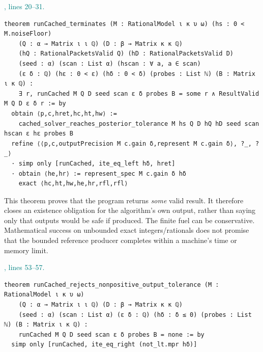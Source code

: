 \documentclass[11pt]{article}\usepackage{needspace}\renewcommand{\paperkind}{Lean companion}\setlength{\parskip}{0.35em}
\begin{document}


{\small\textcolor{teal}{, lines 20--31.}\par}

\begin{lstlisting}[style=BayesSource]
theorem runCached_terminates (M : RationalModel ι κ υ ω) (hs : 0 < M.noiseFloor)
    (Q : α → Matrix ι ι ℚ) (D : β → Matrix κ κ ℚ)
    (hQ : RationalPacketsValid Q) (hD : RationalPacketsValid D)
    (seed : α) (scan : List α) (hscan : ∀ a, a ∈ scan)
    (ε δ : ℚ) (hε : 0 < ε) (hδ : 0 < δ) (probes : List ℕ) (B : Matrix ι κ ℚ) :
    ∃ r, runCached M Q D seed scan ε δ probes B = some r ∧ ResultValid M Q D ε δ r := by
  obtain ⟨p,c,hret,hc,ht,hw⟩ :=
    cached_solver_reaches_posterior_tolerance M hs Q D hQ hD seed scan hscan ε hε probes B
  refine ⟨⟨p,c,outputPrecision M c.gain δ,represent M c.gain δ⟩, ?_, ?_⟩
  · simp only [runCached, ite_eq_left hδ, hret]
  · obtain ⟨he,hr⟩ := represent_spec M c.gain δ hδ
    exact ⟨hc,ht,hw,he,hr,rfl,rfl⟩
\end{lstlisting}

This theorem proves that the program returns \emph{some} valid result. It therefore closes an existence obligation for the algorithm's own output, rather than saying only that outputs would be safe if produced. The finite fuel can be conservative. Mathematical success on unbounded exact integers/rationals does not promise that the bounded reference producer completes within a machine's time or memory limit.



{\small\textcolor{teal}{, lines 53--57.}\par}

\begin{lstlisting}[style=BayesSource]
theorem runCached_rejects_nonpositive_output_tolerance (M : RationalModel ι κ υ ω)
    (Q : α → Matrix ι ι ℚ) (D : β → Matrix κ κ ℚ)
    (seed : α) (scan : List α) (ε δ : ℚ) (hδ : δ ≤ 0) (probes : List ℕ) (B : Matrix ι κ ℚ) :
    runCached M Q D seed scan ε δ probes B = none := by
  simp only [runCached, ite_eq_right (not_lt.mpr hδ)]
\end{lstlisting}
\end{document}
